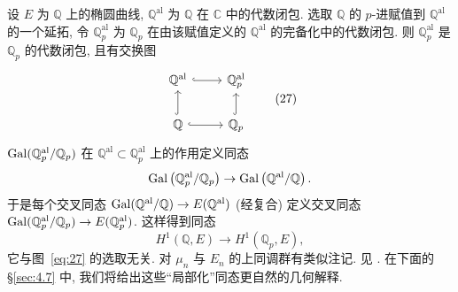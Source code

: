 \begin{aside} \label{thm:4.1.9}
设 $E$ 为 $\mathbb{Q}$ 上的椭圆曲线, $\mathbb{Q}^{\mathrm{al}}$ 为 $\mathbb{Q}$ 在 $\mathbb{C}$ 中的代数闭包. 选取 $\mathbb{Q}$ 的 $p$-进赋值到 $\mathbb{Q}^{\mathrm{al}}$ 的一个延拓, 令 $\mathbb{Q}_p^{\mathrm{al}}$ 为 $\mathbb{Q}_p$ 在由该赋值定义的 $\mathbb{Q}^{\mathrm{al}}$ 的完备化中的代数闭包. 则 $\mathbb{Q}_p^{\mathrm{al}}$ 是 $\mathbb{Q}_p$ 的代数闭包, 且有交换图
\begin{equation} \label{eq:27}
\begin{tikzcd}
{\mathbb{Q}^{\mathrm{al}}} & {\mathbb{Q}_p^{\mathrm{al}}} \\
{\mathbb{Q}} & {\mathbb{Q}_p}
\arrow[hook, from=2-1, to=1-1]
\arrow[hook, from=2-2, to=1-2]
\arrow[hook, from=2-1, to=2-2]
\arrow[hook, from=1-1, to=1-2]
\end{tikzcd}
\tag{27}
\end{equation}
$\operatorname{Gal}(\mathbb{Q}_p^{\mathrm{al}}/\mathbb{Q}_p)$ 在 $\mathbb{Q}^{\mathrm{al}}\subset\mathbb{Q}_p^{\mathrm{al}}$ 上的作用定义同态
\[
\operatorname{Gal}\left(\mathbb{Q}_p^{\mathrm{al}}/\mathbb{Q}_p\right)\to\operatorname{Gal}\left(\mathbb{Q}^{\mathrm{al}}/\mathbb{Q}\right).
\]
于是每个交叉同态 $\operatorname{Gal}(\mathbb{Q}^{\mathrm{al}}/\mathbb{Q})\to E(\mathbb{Q}^{\mathrm{al}})$ (经复合) 定义交叉同态 $\operatorname{Gal}(\mathbb{Q}_p^{\mathrm{al}}/\mathbb{Q}_p)\to E(\mathbb{Q}_p^{\mathrm{al}})$. 这样得到同态
\[
H^1(\mathbb{Q}, E)\to H^1(\mathbb{Q}_p, E),
\]
它与图~\eqref{eq:27} 的选取无关. 对 $\mu_n$ 与 $E_n$ 的上同调群有类似注记. 见 \cite[VII, \S 5, Proposition 3]{serre1979}. 在下面的 \S\ref{sec:4.7} 中, 我们将给出这些``局部化''同态更自然的几何解释.
\end{aside}

